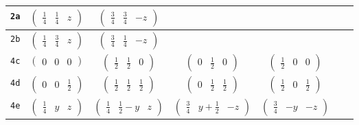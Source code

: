 \documentclass[fleqn,9pt,landscape]{jsarticle}
\begin{document}
\begin{center}
\begin{longtable}{ccccccc}
{\tt 2a} & $ \begin{pmatrix} \frac{1}{4} & \frac{1}{4} & z \end{pmatrix} $ & $ \begin{pmatrix} \frac{3}{4} & \frac{3}{4} & - z \end{pmatrix} $ & $  $ & $  $ & $  $ & $  $ \\ \hline
{\tt 2b} & $ \begin{pmatrix} \frac{1}{4} & \frac{3}{4} & z \end{pmatrix} $ & $ \begin{pmatrix} \frac{3}{4} & \frac{1}{4} & - z \end{pmatrix} $ & $  $ & $  $ & $  $ & $  $ \\ \hline
{\tt 4c} & $ \begin{pmatrix} 0 & 0 & 0 \end{pmatrix} $ & $ \begin{pmatrix} \frac{1}{2} & \frac{1}{2} & 0 \end{pmatrix} $ & $ \begin{pmatrix} 0 & \frac{1}{2} & 0 \end{pmatrix} $ & $ \begin{pmatrix} \frac{1}{2} & 0 & 0 \end{pmatrix} $ & $  $ & $  $ \\ \hline
{\tt 4d} & $ \begin{pmatrix} 0 & 0 & \frac{1}{2} \end{pmatrix} $ & $ \begin{pmatrix} \frac{1}{2} & \frac{1}{2} & \frac{1}{2} \end{pmatrix} $ & $ \begin{pmatrix} 0 & \frac{1}{2} & \frac{1}{2} \end{pmatrix} $ & $ \begin{pmatrix} \frac{1}{2} & 0 & \frac{1}{2} \end{pmatrix} $ & $  $ & $  $ \\ \hline
{\tt 4e} & $ \begin{pmatrix} \frac{1}{4} & y & z \end{pmatrix} $ & $ \begin{pmatrix} \frac{1}{4} & \frac{1}{2} - y & z \end{pmatrix} $ & $ \begin{pmatrix} \frac{3}{4} & y + \frac{1}{2} & - z \end{pmatrix} $ & $ \begin{pmatrix} \frac{3}{4} & - y & - z \end{pmatrix} $ & $  $ & $  $ \\ \hline

\end{longtable}
\end{center}
\end{document}
